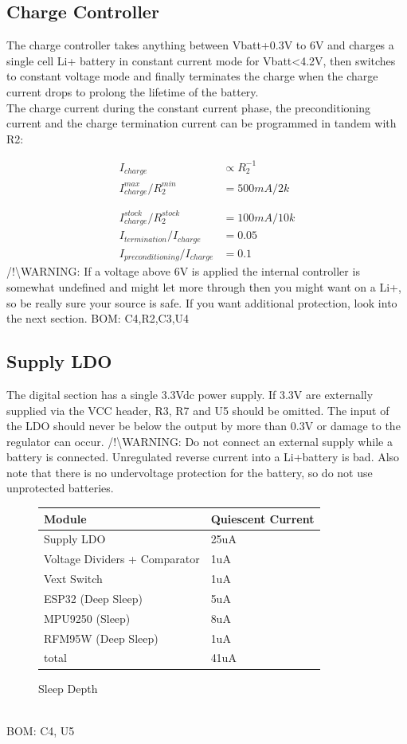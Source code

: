 \documentclass{article}
\begin{document}
\subsection{Charge Controller}
The charge controller takes anything between Vbatt+0.3V to 6V and charges a single cell Li+ battery in constant current mode for Vbatt<4.2V, then switches to constant voltage mode and finally terminates the charge when the charge current drops to prolong the lifetime of the battery.\\
The charge current during the constant current phase, the preconditioning current and the charge termination current can be programmed in tandem with R2:

\begin{align*}
I_{charge} &\propto R_2^{-1}\\
I_{charge}^{max}/R_2^{min}&=500mA/2k\\\\\\
I_{charge}^{stock}/R_2^{stock}&=100mA/10k\\
I_{termination}/I_{charge}&=0.05\\
I_{preconditioning}/I_{charge}&=0.1
\end{align*} 
/!\textbackslash WARNING: If a voltage above 6V is applied the internal controller is somewhat undefined and might let more through then you might want on a Li+, so be really sure your source is safe. If you want additional protection, look into the next section.
\newline \newline
BOM: C4,R2,C3,U4

\subsection{Supply LDO}
The digital section has a single 3.3Vdc power supply. If 3.3V are externally supplied via the VCC header, R3, R7 and U5 should be omitted. The input of the LDO should never be below the output by more than 0.3V or damage to the regulator can occur.
\newline \newline
/!\textbackslash WARNING: Do not connect an external supply while a battery is connected. Unregulated reverse current into a Li+battery is bad. Also note that there is no undervoltage protection for the battery, so do not use unprotected batteries. 
\begin{figure}[h]
\centering
\begin{tabular}{ l l }
    Module & Quiescent Current \\
    \hline
    Supply LDO & 25uA  \\
    Voltage Dividers + Comparator & 1uA \\
    Vext Switch & 1uA \\
    ESP32 (Deep Sleep) & 5uA \\
    MPU9250 (Sleep) & 8uA \\
    RFM95W (Deep Sleep) & 1uA \\
    \hline
    total & 41uA \\
\end{tabular}
\caption{Sleep Depth}
\end{figure}
\\BOM: C4, U5
\end{document}

